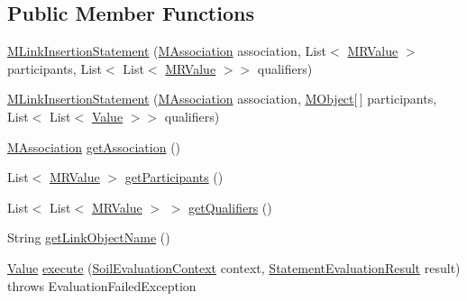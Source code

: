 \subsection*{Public Member Functions}
\begin{DoxyCompactItemize}
\item 
\hyperlink{classorg_1_1tzi_1_1use_1_1uml_1_1sys_1_1soil_1_1_m_link_insertion_statement_aa2afe8f09d2388360c2013193881cdf0}{M\-Link\-Insertion\-Statement} (\hyperlink{interfaceorg_1_1tzi_1_1use_1_1uml_1_1mm_1_1_m_association}{M\-Association} association, List$<$ \hyperlink{classorg_1_1tzi_1_1use_1_1uml_1_1sys_1_1soil_1_1_m_r_value}{M\-R\-Value} $>$ participants, List$<$ List$<$ \hyperlink{classorg_1_1tzi_1_1use_1_1uml_1_1sys_1_1soil_1_1_m_r_value}{M\-R\-Value} $>$$>$ qualifiers)
\item 
\hyperlink{classorg_1_1tzi_1_1use_1_1uml_1_1sys_1_1soil_1_1_m_link_insertion_statement_a510e6ea7524a9489c505930171c7e9bd}{M\-Link\-Insertion\-Statement} (\hyperlink{interfaceorg_1_1tzi_1_1use_1_1uml_1_1mm_1_1_m_association}{M\-Association} association, \hyperlink{interfaceorg_1_1tzi_1_1use_1_1uml_1_1sys_1_1_m_object}{M\-Object}\mbox{[}$\,$\mbox{]} participants, List$<$ List$<$ \hyperlink{classorg_1_1tzi_1_1use_1_1uml_1_1ocl_1_1value_1_1_value}{Value} $>$$>$ qualifiers)
\item 
\hyperlink{interfaceorg_1_1tzi_1_1use_1_1uml_1_1mm_1_1_m_association}{M\-Association} \hyperlink{classorg_1_1tzi_1_1use_1_1uml_1_1sys_1_1soil_1_1_m_link_insertion_statement_a1adc6e0b4efc33ed89cc08605fbdd697}{get\-Association} ()
\item 
List$<$ \hyperlink{classorg_1_1tzi_1_1use_1_1uml_1_1sys_1_1soil_1_1_m_r_value}{M\-R\-Value} $>$ \hyperlink{classorg_1_1tzi_1_1use_1_1uml_1_1sys_1_1soil_1_1_m_link_insertion_statement_a30a8e0ec850a4a4f4b9790699449d580}{get\-Participants} ()
\item 
List$<$ List$<$ \hyperlink{classorg_1_1tzi_1_1use_1_1uml_1_1sys_1_1soil_1_1_m_r_value}{M\-R\-Value} $>$ $>$ \hyperlink{classorg_1_1tzi_1_1use_1_1uml_1_1sys_1_1soil_1_1_m_link_insertion_statement_a77d9aa1624e1af9beb5f21a87da4fd63}{get\-Qualifiers} ()
\item 
String \hyperlink{classorg_1_1tzi_1_1use_1_1uml_1_1sys_1_1soil_1_1_m_link_insertion_statement_ac6c74b97ca691cd44b37d401d037be40}{get\-Link\-Object\-Name} ()
\item 
\hyperlink{classorg_1_1tzi_1_1use_1_1uml_1_1ocl_1_1value_1_1_value}{Value} \hyperlink{classorg_1_1tzi_1_1use_1_1uml_1_1sys_1_1soil_1_1_m_link_insertion_statement_a64de47986ed6a4ed5d40bac2c2d51549}{execute} (\hyperlink{classorg_1_1tzi_1_1use_1_1uml_1_1sys_1_1soil_1_1_soil_evaluation_context}{Soil\-Evaluation\-Context} context, \hyperlink{classorg_1_1tzi_1_1use_1_1uml_1_1sys_1_1_statement_evaluation_result}{Statement\-Evaluation\-Result} result)  throws Evaluation\-Failed\-Exception 

\end{DoxyCompactItemize}
